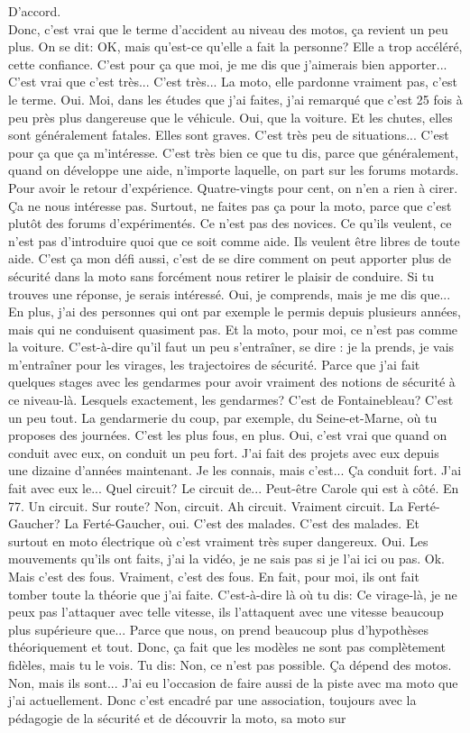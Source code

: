 D'accord. \\
 Donc, c'est vrai que le terme d'accident au niveau des motos, ça revient un peu plus. On se dit: OK, mais qu'est-ce qu'elle a fait la personne? Elle a trop accéléré, cette confiance. C'est pour ça que moi, je me dis que j'aimerais bien apporter... C'est vrai que c'est très... C'est très... La moto, elle pardonne vraiment pas, c'est le terme. Oui. Moi, dans les études que j'ai faites, j'ai remarqué que c'est 25 fois à peu près plus dangereuse que le véhicule. Oui, que la voiture. Et les chutes, elles sont généralement fatales. Elles sont graves. C'est très peu de situations... C'est pour ça que ça m'intéresse. C'est très bien ce que tu dis, parce que généralement, quand on développe une aide, n'importe laquelle, on part sur les forums motards. Pour avoir le retour d'expérience. Quatre-vingts pour cent, on n'en a rien à cirer. Ça ne nous intéresse pas. Surtout, ne faites pas ça pour la moto, parce que c'est plutôt des forums d'expérimentés. Ce n'est pas des novices. Ce qu'ils veulent, ce n'est pas d'introduire quoi que ce soit comme aide. Ils veulent être libres de toute aide. C'est ça mon défi aussi, c'est de se dire comment on peut apporter plus de sécurité dans la moto sans forcément nous retirer le plaisir de conduire. Si tu trouves une réponse, je serais intéressé. Oui, je comprends, mais je me dis que... En plus, j'ai des personnes qui ont par exemple le permis depuis plusieurs années, mais qui ne conduisent quasiment pas. Et la moto, pour moi, ce n'est pas comme la voiture. C'est-à-dire qu'il faut un peu s'entraîner, se dire : je la prends, je vais m'entraîner pour les virages, les trajectoires de sécurité. Parce que j'ai fait quelques stages avec les gendarmes pour avoir vraiment des notions de sécurité à ce niveau-là. Lesquels exactement, les gendarmes? C'est de Fontainebleau? C'est un peu tout. La gendarmerie du coup, par exemple, du Seine-et-Marne, où tu proposes des journées. C'est les plus fous, en plus. Oui, c'est vrai que quand on conduit avec eux, on conduit un peu fort. J'ai fait des projets avec eux depuis une dizaine d'années maintenant. Je les connais, mais c'est... Ça conduit fort. J'ai fait avec eux le... Quel circuit? Le circuit de... Peut-être Carole qui est à côté. En 77. Un circuit. Sur route? Non, circuit. Ah circuit. Vraiment circuit. La Ferté-Gaucher? La Ferté-Gaucher, oui. C'est des malades. C'est des malades. Et surtout en moto électrique où c'est vraiment très super dangereux. Oui. Les mouvements qu'ils ont faits, j'ai la vidéo, je ne sais pas si je l'ai ici ou pas. Ok. Mais c'est des fous. Vraiment, c'est des fous. En fait, pour moi, ils ont fait tomber toute la théorie que j'ai faite. C'est-à-dire là où tu dis: Ce virage-là, je ne peux pas l'attaquer avec telle vitesse, ils l'attaquent avec une vitesse beaucoup plus supérieure que... Parce que nous, on prend beaucoup plus d'hypothèses théoriquement et tout. Donc, ça fait que les modèles ne sont pas complètement fidèles, mais tu le vois. Tu dis: Non, ce n'est pas possible. Ça dépend des motos. Non, mais ils sont... J'ai eu l'occasion de faire aussi de la piste avec ma moto que j'ai actuellement. Donc c'est encadré par une association, toujours avec la pédagogie de la sécurité et de découvrir la moto, sa moto sur 